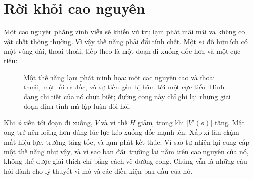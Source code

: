 \section{Rời khỏi cao nguyên}

Một cao nguyên phẳng vĩnh viễn sẽ khiến vũ trụ lạm phát mãi mãi và không có vật chất thông thường. Vì vậy thế năng phải đổi tính chất. Một sơ đồ hữu ích có một vùng dài, thoai thoải, tiếp theo là một đoạn đi xuống dốc hơn và một cực tiểu:
\begin{figure}[htbp]
\centering
\begin{coursefitfigure}
\end{coursefitfigure}
\caption{Một thế năng lạm phát minh họa: một cao nguyên cao và thoai thoải, một lối ra dốc, và sự tiến gần bị hãm tới một cực tiểu. Hình dạng chi tiết của nó chưa biết; đường cong này chỉ ghi lại những giai đoạn định tính mà lập luận đòi hỏi.}
\label{fig:c09-inflation-potential}
\end{figure}

Khi \(\phi\) tiến tới đoạn đi xuống, \(V\) và vì thế \(H\) giảm, trong khi \(\lvert V'(\phi)\rvert\) tăng. Mật ong trở nên loãng hơn đúng lúc lực kéo xuống dốc mạnh lên. Xấp xỉ lăn chậm mất hiệu lực, trường tăng tốc, và lạm phát kết thúc. Vì sao tự nhiên lại cung cấp một thế năng như vậy, và vì sao ban đầu trường lại nằm trên cao nguyên của nó, không thể được giải thích chỉ bằng cách vẽ đường cong. Chúng vẫn là những câu hỏi dành cho lý thuyết vi mô và các điều kiện ban đầu của nó.

\begin{classroomqa}
\end{classroomqa}

